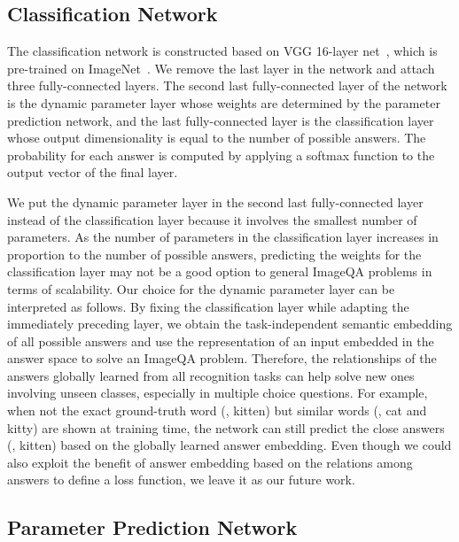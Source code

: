\documentclass[10pt,twocolumn,letterpaper]{article}
\begin{document}
\subsection{Classification Network}




The classification network is constructed based on VGG 16-layer net~\cite{Vgg16}, which is pre-trained on ImageNet~\cite{ImageNet}.
We remove the last layer in the network and attach three fully-connected layers.
The second last fully-connected layer of the network is the dynamic parameter layer whose weights are determined by the parameter prediction network, and the last fully-connected layer is the classification layer whose output dimensionality is equal to the number of possible answers.
The probability for each answer is computed by applying a softmax function to the output vector of the final layer.




We put the dynamic parameter layer in the second last fully-connected layer instead of the classification layer because it involves the smallest number of parameters.
As the number of parameters in the classification layer increases in proportion to the number of possible answers, predicting the weights for the classification layer may not be a good option to general ImageQA problems in terms of scalability.
Our choice for the dynamic parameter layer can be interpreted as follows. 
By fixing the classification layer while adapting the immediately preceding layer, we obtain the task-independent semantic embedding of all possible answers and use the representation of an input embedded in the answer space to solve an ImageQA problem.
Therefore, the relationships of the answers globally learned from all recognition tasks can help solve new ones involving unseen classes, especially in multiple choice questions.
For example, when not the exact ground-truth word (\eg, kitten) but similar words (\eg, cat and kitty) are shown at training time, the network can still predict the close answers (\eg, kitten) based on the globally learned answer embedding.
Even though we could also exploit the benefit of answer embedding based on the relations among answers to define a loss function, we leave it as our future work.




\subsection{Parameter Prediction Network}
\label{sub:paramter}
\end{document}
